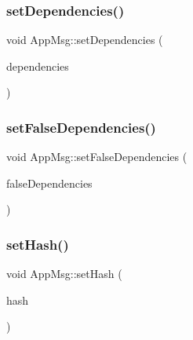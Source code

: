 \subsubsection{\texorpdfstring{set\+Dependencies()}{setDependencies()}}
{\footnotesize\ttfamily void App\+Msg\+::set\+Dependencies (\begin{DoxyParamCaption}\item[{const \hyperlink{AppMsg__m_8h_a39bb58326d7e24febcd7397c022ada6a}{App\+Msg\+Dep} \&}]{dependencies }\end{DoxyParamCaption})\hspace{0.3cm}{\ttfamily [virtual]}}

\mbox{\label{classAppMsg_ab810112cdc978f6c93b2d45e4aa6f094}} 
\subsubsection{\texorpdfstring{set\+False\+Dependencies()}{setFalseDependencies()}}
{\footnotesize\ttfamily void App\+Msg\+::set\+False\+Dependencies (\begin{DoxyParamCaption}\item[{const \hyperlink{AppMsg__m_8h_a2b8cadfd13c916ddccf5a213ca34d8ee}{App\+Msg\+False\+Dep} \&}]{false\+Dependencies }\end{DoxyParamCaption})\hspace{0.3cm}{\ttfamily [virtual]}}

\mbox{\label{classAppMsg_afd406d5bf0b92892a1ebf8fe3397331a}} 
\subsubsection{\texorpdfstring{set\+Hash()}{setHash()}}
{\footnotesize\ttfamily void App\+Msg\+::set\+Hash (\begin{DoxyParamCaption}\item[{unsigned long}]{hash }\end{DoxyParamCaption})\hspace{0.3cm}{\ttfamily [virtual]}}

\mbox{\label{classAppMsg_ac76f921f7a873b5ca4b944fbbacfdf1c}} 
